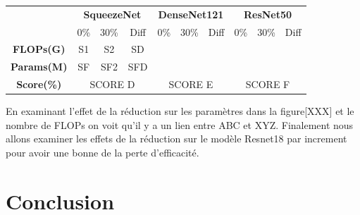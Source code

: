 \documentclass[12pt]{article}
\begin{document}
\begin{table}[H]
\begin{tabular}{cccccccccc}
	& \multicolumn{3}{c}{\textbf{SqueezeNet}}                                                                     & \multicolumn{3}{c}{\textbf{DenseNet121}}                                                                    & \multicolumn{3}{c}{\textbf{ResNet50}}                                                                     \\
	& 0\%                       & 30\%                      & Diff                                                & 0\%                       & 30\%                      & Diff                                                & 0\%                       & 30\%                     & Diff                                               \\ \cline{2-10} 
	\multicolumn{1}{c|}{\textbf{FLOPs(G)}}  & S1                        & S2                        & \multicolumn{1}{c|}{SD}                             &                           &                           & \multicolumn{1}{c|}{}                               &                           &                          &                                                    \\
	\multicolumn{1}{c|}{\textbf{Params(M)}} & SF                        & SF2                       & \multicolumn{1}{c|}{SFD}                            &                           &                           & \multicolumn{1}{c|}{}                               &                           &                          &                                                    \\
	\multicolumn{1}{c|}{\textbf{Score(\%)}} & \multicolumn{3}{c|}{SCORE D}                                                                                & \multicolumn{3}{c|}{SCORE E}                                                                                & \multicolumn{3}{c|}{SCORE F}                                                                             
\end{tabular}
\end{table}

En examinant l’effet de la réduction sur les paramètres dans la figure[XXX] et le nombre de FLOPs on voit qu’il y a un lien entre ABC et XYZ. 
Finalement nous allons examiner les effets de la réduction sur le modèle Resnet18 par increment pour avoir une bonne de la perte d’efficacité. 

\section*{Conclusion}

\newpage



\end{document}
